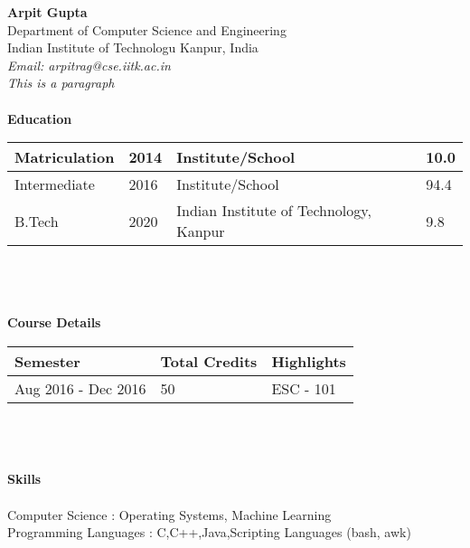 \documentclass{article}
\begin{document}
\noindent \hspace{1mm}\textbf{Arpit Gupta}\\
\hspace*{1mm}Department of Computer Science and Engineering\\
\hspace*{1mm}Indian Institute of Technologu Kanpur, India\\
\hspace*{1mm}\textit{Email: arpitrag@cse.iitk.ac.in}\\
\hline
\hline
\vspace{1mm}
\noindent \textit{This is a paragraph} \lipsum[50]\\
\vspace{1mm}
\hline
\hline\\
\vspace{3mm}
\noindent \hspace*{1mm} \textbf{Education} \\

\noindent\begin{tabular}{|l|l|l|l|}
\hline
    Matriculation & 2014 & Institute/School & 10.0  \\\hline
     Intermediate & 2016 & Institute/School & 94.4\\\hline
     B.Tech & 2020 & Indian Institute of Technology, Kanpur & 9.8\\\hline
\end{tabular}\\ \\ \\
\hspace*{1mm}\textbf{Course Details}\\

\noindent\begin{tabular}{|l|l|l|}
\hline
    \textbf{Semester} & \textbf{Total Credits} & \textbf{Highlights}  \\\hline
     Aug 2016 - Dec 2016 & 50 & ESC - 101 \\\hline
\end{tabular}\\ \\ \\
\hspace*{1mm} \textbf{Skills}\\\\
\hspace*{1mm} Computer Science \hspace{13mm} : \hspace*{1mm}Operating Systems, Machine Learning\\
\hspace*{1mm} Programming Languages \hspace{3mm} : \hspace*{1mm}C,C++,Java,Scripting Languages (bash, awk)\\
\end{document}

